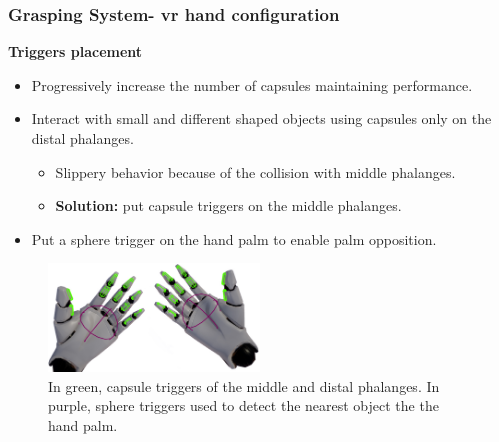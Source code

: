 \documentclass{beamer}
\theoremstyle{remark}
\theoremstyle{plain}
\begin{document}
\begin{frame}
\frametitle{Grasping System- vr hand configuration}

\textbf{Triggers placement}

\begin{itemize}
	\item Progressively increase the number of capsules maintaining performance.
	\item Interact with small and different shaped objects using capsules only on the distal phalanges.
	\begin{itemize}
		\item Slippery behavior because of the collision with middle phalanges.
		\item \textbf{Solution:} put capsule triggers on the middle phalanges.
	\end{itemize}
	\item Put a sphere trigger on the hand palm to enable palm opposition.
\end{itemize}

\begin{figure}
	\centering
	\includegraphics[width=0.5\textwidth]{images/mannequin_hands}
	\caption{In green, capsule triggers of the middle and distal phalanges. In purple, sphere triggers used to detect the nearest object the the hand palm.}
\end{figure}
\end{frame}
\end{document}
